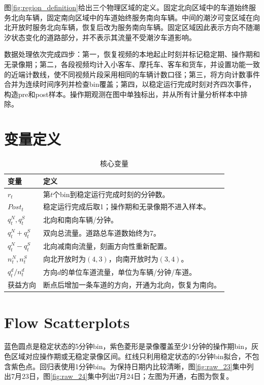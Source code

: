 \documentclass[11pt,a4paper]{ctexart}
\begin{document}
图\ref{fig:region_definition}给出三个物理区域的定义。固定北向区域中的车道始终服务北向车辆，固定南向区域中的车道始终服务南向车辆。中间的潮汐可变区域在向北开放时服务北向车辆，恢复后改为服务南向车辆。固定区域因此表示方向不随潮汐状态变化的道路部分，并不表示其流量不受潮汐车道影响。

数据处理依次完成四步：第一，恢复视频的本地起止时刻并标记稳定期、操作期和无录像期；第二，各段视频均计入小客车、摩托车、客车和货车，并设置功能一致的近端计数线，使不同视频片段采用相同的车辆计数口径；第三，将方向计数事件合并为连续时间序列并检查bin覆盖；第四，以稳定运行完成时刻对齐四次事件，构造pre和post样本。操作期观测在图中单独标出，并从所有计量分析样本中排除。

\section{变量定义}

\begin{table}[H]
\centering
\caption{核心变量}
\label{tab:variables}
\begin{tabularx}{\textwidth}{p{}X}
\toprule
变量 & 定义 \\
\midrule
$r_t$ & 第$t$个bin到稳定运行完成时刻的分钟数。\\
$Post_t$ & 稳定运行完成后取1；操作期和无录像期不进入样本。\\
$q^N_t,q^S_t$ & 北向和南向车辆/分钟。\\
$q^N_t+q^S_t$ & 双向总流量。道路总车道数始终为7。\\
$q^N_t-q^S_t$ & 北向减南向流量，刻画方向性重新配置。\\
$n^N_t,n^S_t$ & 向北开放时为$(4,3)$，向南开放时为$(3,4)$。\\
$q^d_t/n^d_t$ & 方向$d$的单位车道流量，单位为车辆/分钟/车道。\\
获益方向 & 断点后增加一条车道的方向，开通为北向，恢复为南向。\\
\bottomrule
\end{tabularx}
\end{table}

\clearpage
\section{Flow Scatterplots}

蓝色圆点是稳定状态的5分钟bin，紫色菱形是录像覆盖至少1分钟的操作期bin，灰色区域对应操作期或无稳定录像区间。红线只利用稳定状态的5分钟bin拟合，不包含紫色点。回归表使用1分钟bin。为保持日期内比较清晰，图\ref{fig:raw_23}集中列出7月23日，图\ref{fig:raw_24}集中列出7月24日；左图为开通，右图为恢复。
\end{document}
